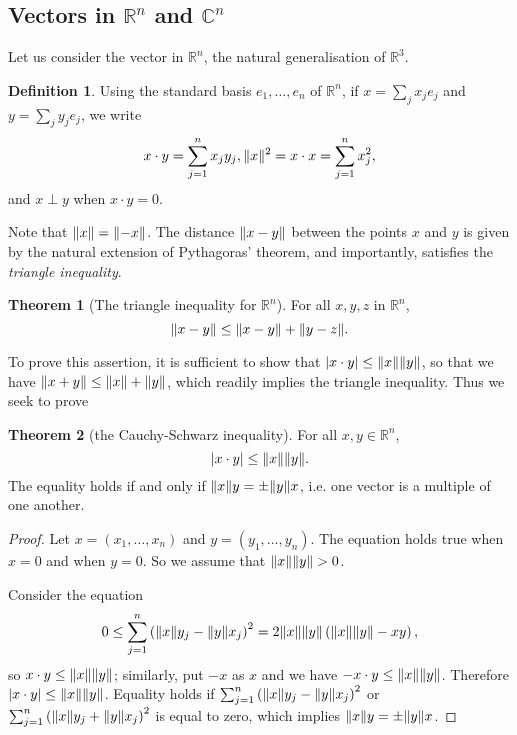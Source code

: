 \documentclass[12pt]{book}
\newcommand{\CC}{\mathbb C}
\newcommand{\RR}{\mathbb R}
\theoremstyle{definition}
\newtheorem{definition}{Definition}[section]
\newtheorem{theorem}{Theorem}[chapter]
\theoremstyle{remark}
\DeclarePairedDelimiter\abs{\lvert}{\rvert}
\DeclarePairedDelimiter\norm{\lVert}{\rVert}
\begin{document}
			\subsection{Vectors in $\RR^n$ and $\CC^n$}
				Let us consider the vector in $\RR^n$, the natural generalisation of $\RR^3$.
				\begin{definition}
					Using the standard basis $e_1, \ldots, e_n$ of $\RR^n$, if $x = \sum_j x_j e_j$ and $y = \sum_j y_j e_j$, we write
					\begin{equation*}
						x \cdot y = \sum_{j = 1}^{n} x_j y_j, \norm{x}^2 = x \cdot x = \sum_{j = 1}^{n} x^2_j,
					\end{equation*}
					and $x \perp y$ when $x\cdot y = 0$.
				\end{definition}
			Note that $\norm x = \norm {-x}$. The distance $\norm{x - y}$ between the points $x$ and $y$ is given by the natural extension of Pythagoras' theorem, and importantly, satisfies the \textit{triangle inequality}.
			\begin{theorem}[The triangle inequality for $\RR^n$]
				For all $x, y, z$ in $\RR^n$,
				\begin{equation}
					\norm{x - y} \leq \norm{x - y} + \norm{y - z}.
				\end{equation}
			\end{theorem}
			To prove this assertion, it is sufficient to show that $\abs{x \cdot y} \leq \norm x \norm y$, so that we have $\norm{x + y} \leq \norm x + \norm y$, which readily implies the triangle inequality. Thus we seek to prove
			\begin{theorem}[the Cauchy-Schwarz inequality]
				For all $x, y \in \RR^n$,
				\begin{equation}
					\abs{x \cdot y} \leq \norm x \norm y.
				\end{equation}
				The equality holds if and only if $\norm x y = \pm \norm y x$, i.e. one vector is a multiple of one another. 
			\end{theorem}
			\begin{proof}
				Let $x = (x_1, \ldots, x_n)$ and $y = (y_1, \ldots, y_n)$. The equation holds true when $x = 0$ and when $y = 0$. So we assume that $\norm x \norm y > 0$.
				
				Consider the equation
				\begin{equation*}
					0 \leq \sum_{j = 1}^n \left(\norm x y_j - \norm y x_j\right)^2 = 2\norm x \norm y \left(\norm x \norm y - xy\right),
				\end{equation*}
				so $x \cdot y \leq \norm x \norm y$; similarly, put $ - x $ as $x$ and we have $- x \cdot y \leq \norm x\norm y$. Therefore $\abs{x \cdot y} \leq \norm x \norm y$. Equality holds if $\sum_{j = 1}^n \left(\norm x y_j - \norm y x_j\right)^2$ or $\sum_{j = 1}^n \left(\norm x y_j + \norm y x_j\right)^2$ is equal to zero, which implies $ \norm x y = \pm \norm y x$.
			\end{proof}
		
\end{document}
